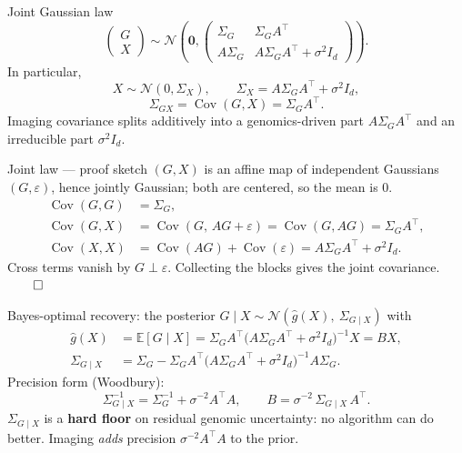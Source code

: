 \documentclass[aspectratio=169,12pt]{beamer}
\newcommand{\E}{\mathbb{E}}
\newcommand{\N}{\mathcal{N}}
\newcommand{\Cov}{\operatorname{Cov}}
\newcommand{\Sg}{\Sigma_{G}}
\newcommand{\Sx}{\Sigma_{X}}
\newcommand{\Sgx}{\Sigma_{GX}}
\newcommand{\Sgcx}{\Sigma_{G\mid X}}
\newcommand{\T}{^{\top}}
\begin{document}
\begin{frame}{Joint Gaussian law}
  \[
  \begin{pmatrix} G\\ X \end{pmatrix}
  \sim
  \N\!\left(
  \mathbf{0},
  \begin{pmatrix}
  \Sg & \Sg A\T\\
  A\Sg & A\Sg A\T + \sigma^2 I_d
  \end{pmatrix}
  \right).
  \]
  \vfill
  In particular,
  \[
    X \sim \N(0,\Sx), \qquad \Sx = A\Sg A\T + \sigma^2 I_d,
  \]
  \[
    \Sgx = \Cov(G,X) = \Sg A\T.
  \]
  \vfill
  \footnotesize
  Imaging covariance splits additively into a genomics-driven part $A\Sg A\T$
  and an irreducible part $\sigma^2 I_d$.
\end{frame}

\begin{frame}{Joint law --- proof sketch}
  \small
  $(G,X)$ is an affine map of independent Gaussians $(G,\varepsilon)$, hence jointly Gaussian; both are centered, so the mean is $0$.
  \vfill
  \begin{align*}
    \Cov(G,G) &= \Sg,\\
    \Cov(G,X) &= \Cov(G,\,AG+\varepsilon) = \Cov(G,AG) = \Sg A\T,\\
    \Cov(X,X) &= \Cov(AG) + \Cov(\varepsilon) = A\Sg A\T + \sigma^2 I_d.
  \end{align*}
  \vfill
  Cross terms vanish by $G \perp \varepsilon$. Collecting the blocks gives the joint covariance. \hfill$\qed$
\end{frame}

\begin{frame}{Bayes-optimal recovery: the posterior}
  $G \mid X \sim \N(\hat g(X),\ \Sgcx)$ with
  \begin{align*}
    \hat g(X) &= \E[G\mid X] = \Sg A\T\big(A\Sg A\T + \sigma^2 I_d\big)^{-1} X = BX,\\[2pt]
    \Sgcx &= \Sg - \Sg A\T\big(A\Sg A\T + \sigma^2 I_d\big)^{-1} A\Sg.
  \end{align*}
  \vfill
  Precision form (Woodbury):
  \[
    \Sgcx^{-1} = \Sg^{-1} + \sigma^{-2} A\T A,
    \qquad B = \sigma^{-2}\,\Sgcx\, A\T.
  \]
  \vfill
  \footnotesize
  $\Sgcx$ is a \textbf{hard floor} on residual genomic uncertainty: no algorithm
  can do better. Imaging \emph{adds} precision $\sigma^{-2}A\T A$ to the prior.
\end{frame}
\end{document}
